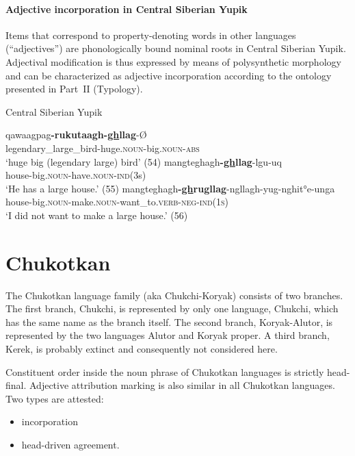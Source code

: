 \paragraph*{Adjective incorporation in Central Siberian Yupik}
Items that correspond to property-denoting words in other languages (“adjectives”) are phonologically bound nominal roots in Central Siberian Yupik. Adjectival modification is thus expressed by means of polysynthetic morphology and can be characterized as adjective incorporation according to the ontology presented in Part~II (Typology).
\begin{exe}
\ex \rm{Central Siberian Yupik \citep{de-reuse1994}}
\begin{xlist}
\ex
\gll	qawaagpag\textbf{-rukutaagh-\underline{gh}llag}-Ø\\
	legendary\_large\_bird-huge.\textsc{noun}-big.\textsc{noun}-\textsc{abs}\\
\glt	‘huge big (legendary large) bird’ (54)
\ex	
\gll	mangteghagh\textbf{-\underline{gh}llag}-lgu-uq\\
	house-big.\textsc{noun}-have.\textsc{noun}-\textsc{ind}(3s)\\
\glt	‘He has a large house.’ (55)
\ex	
\gll	mangteghagh\textbf{-\underline{gh}rugllag}-ngllagh-yug-nghit°e-unga\\
	house-big.\textsc{noun}-make.\textsc{noun}-want\_to.\textsc{verb}-\textsc{neg}-\textsc{ind(1s)}\\
\glt	‘I did not want to make a large house.’ (56)
\end{xlist}
\end{exe}

\section{Chukotkan}
The Chukotkan language family (aka Chukchi-Koryak) consists of two branches. The first branch, Chukchi, is represented by only one language, Chukchi, which has the same name as the branch itself. The second branch, Koryak-Alutor, is represented by the two languages Alutor and Koryak proper. A third branch, Kerek, is probably extinct \citep[253]{salminen2007} and consequently not considered here.

Constituent order inside the noun phrase of Chukotkan languages is strictly head-final. Adjective attribution marking is also similar in all Chukotkan languages. Two types are attested:
\begin{itemize}
\item incorporation
\item head\hyp{}driven agreement.
\end{itemize}

